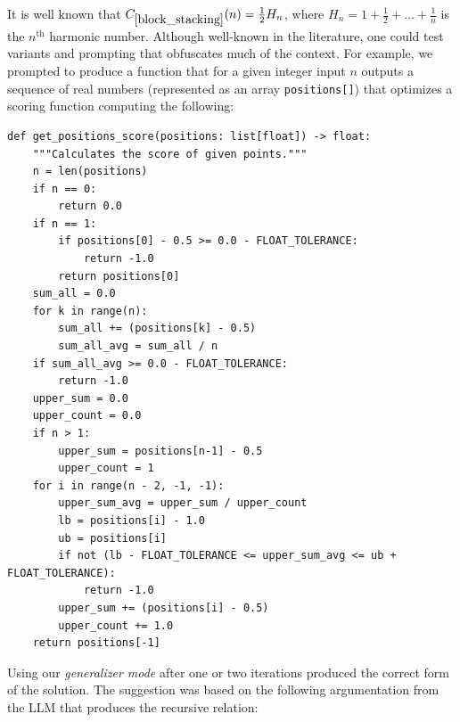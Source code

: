 

It is well known that $C_{\ref{block_stacking}}(n) = \frac{1}{2} H_n$, where $H_n = 1 + \frac{1}{2} + \dots + \frac{1}{n}$ is the $n^{\mathrm{th}}$ harmonic number.  Although well-known in the literature, one could test variants and prompting that obfuscates much of the context. For example, we prompted \AlphaEvolve to produce a function that for a given integer input $n$ outputs a sequence of real numbers (represented as an array \texttt{positions[]}) that optimizes a scoring function computing the following:

{\small
\begin{verbatim}
def get_positions_score(positions: list[float]) -> float:
    """Calculates the score of given points."""
    n = len(positions)
    if n == 0:
        return 0.0
    if n == 1:
        if positions[0] - 0.5 >= 0.0 - FLOAT_TOLERANCE:
            return -1.0
        return positions[0]
    sum_all = 0.0
    for k in range(n):
        sum_all += (positions[k] - 0.5)
        sum_all_avg = sum_all / n
    if sum_all_avg >= 0.0 - FLOAT_TOLERANCE:
        return -1.0
    upper_sum = 0.0
    upper_count = 0.0
    if n > 1:
        upper_sum = positions[n-1] - 0.5
        upper_count = 1
    for i in range(n - 2, -1, -1):
        upper_sum_avg = upper_sum / upper_count
        lb = positions[i] - 1.0
        ub = positions[i]
        if not (lb - FLOAT_TOLERANCE <= upper_sum_avg <= ub + FLOAT_TOLERANCE):
            return -1.0
        upper_sum += (positions[i] - 0.5)
        upper_count += 1.0
    return positions[-1]
\end{verbatim}
}

Using our \textit{generalizer mode} after one or two iterations \AlphaEvolve produced the correct form of the solution. The suggestion was based on the following argumentation from the LLM that produces the recursive relation:


